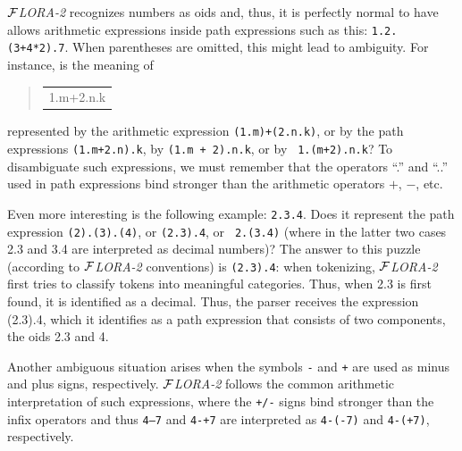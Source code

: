 \documentclass[11pt]{article}
\newenvironment{qrules}{\begin{quote}\tt\begin{tabular}[t]{l}}%
{\end{tabular}\end{quote}}
\newcommand{\FLORA}{{\mbox{${\cal F}${\small\it LORA}\rm\emph{-2}}}\xspace}
\begin{document}
\FLORA recognizes numbers as oids and, thus, it is perfectly normal to have
allows arithmetic expressions inside path expressions such as this:
{\tt 1.2.(3+4*2).7}. When parentheses are omitted, this might lead to
ambiguity.
For instance, is the meaning of
\begin{qrules}
1.m+2.n.k
\end{qrules}
represented by
the arithmetic expression {\tt (1.m)+(2.n.k)}, or by
the path expressions {\tt (1.m+2.n).k}, by {\tt (1.m + 2).n.k}, or by {\tt
  1.(m+2).n.k}? To disambiguate such expressions, we must remember that the
operators ``.'' and ``..'' used in path expressions bind stronger than the
arithmetic operators $+$, $-$, etc.

Even more interesting is the following example: {\tt 2.3.4}. Does it
represent the path expression {\tt (2).(3).(4)}, or {\tt (2.3).4}, or {\tt
  2.(3.4)} (where in the latter two cases 2.3 and 3.4 are interpreted as
decimal numbers)? The answer to this puzzle (according to \FLORA conventions)
is {\tt (2.3).4}: when
tokenizing, \FLORA first tries to classify tokens into meaningful
categories. Thus, when 2.3 is first found, it is identified as a
decimal. Thus, the parser receives the expression (2.3).4, which it
identifies as a path expression that consists of two components, the oids
2.3 and 4.

Another ambiguous situation arises when the symbols {\tt -} and {\tt +} are
used as minus and plus
signs, respectively. \FLORA follows the common arithmetic interpretation of
such expressions, where the {\tt +/-} signs bind stronger than the infix
operators and thus
{\tt 4--7} and {\tt 4-+7} are interpreted as {\tt 4-(-7)} and {\tt 4-(+7)},
respectively.
\end{document}
